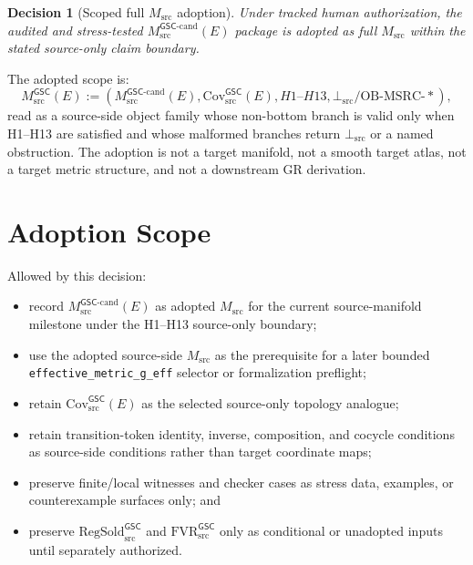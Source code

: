 \documentclass[11pt]{article}
\newcommand{\Msrc}{M_{\mathrm{src}}}
\newcommand{\Mgsccand}{M_{\mathrm{src}}^{\mathsf{GSC}\mbox{-}\mathrm{cand}}}
\newcommand{\RegSold}{\mathrm{RegSold}_{\mathrm{src}}^{\mathsf{GSC}}}
\newcommand{\FVR}{\mathrm{FVR}_{\mathrm{src}}^{\mathsf{GSC}}}
\newcommand{\BottomSrc}{\bot_{\mathrm{src}}}
\newcommand{\CovSrc}{\mathrm{Cov}_{\mathrm{src}}^{\mathsf{GSC}}}
\newtheorem{decision}{Decision}
\begin{document}
\begin{decision}[Scoped full \(M_{\mathrm{src}}\) adoption]
Under tracked human authorization, the audited and stress-tested
\(\Mgsccand(E)\) package is adopted as full \(\Msrc\) within the stated
source-only claim boundary.
\end{decision}

The adopted scope is:
\[
  \Msrc^{\mathsf{GSC}}(E)
  :=
  \left(
    \Mgsccand(E),
    \CovSrc(E),
    H1\mbox{--}H13,
    \BottomSrc/\mathrm{OB\mbox{-}MSRC\mbox{-}*}
  \right),
\]
read as a source-side object family whose non-bottom branch is valid only
when H1--H13 are satisfied and whose malformed branches return
\(\BottomSrc\) or a named obstruction. The adoption is not a target
manifold, not a smooth target atlas, not a target metric structure, and not a
downstream GR derivation.

\section{Adoption Scope}

Allowed by this decision:
\begin{itemize}[leftmargin=*]
  \item record \(\Mgsccand(E)\) as adopted \(\Msrc\) for the current
  source-manifold milestone under the H1--H13 source-only boundary;
  \item use the adopted source-side \(\Msrc\) as the prerequisite for a later
  bounded \texttt{effective\_metric\_g\_eff} selector or formalization
  preflight;
  \item retain \(\CovSrc(E)\) as the selected source-only topology analogue;
  \item retain transition-token identity, inverse, composition, and cocycle
  conditions as source-side conditions rather than target coordinate maps;
  \item preserve finite/local witnesses and checker cases as stress data,
  examples, or counterexample surfaces only; and
  \item preserve \(\RegSold\) and \(\FVR\) only as conditional or unadopted
  inputs until separately authorized.
\end{itemize}
\end{document}
